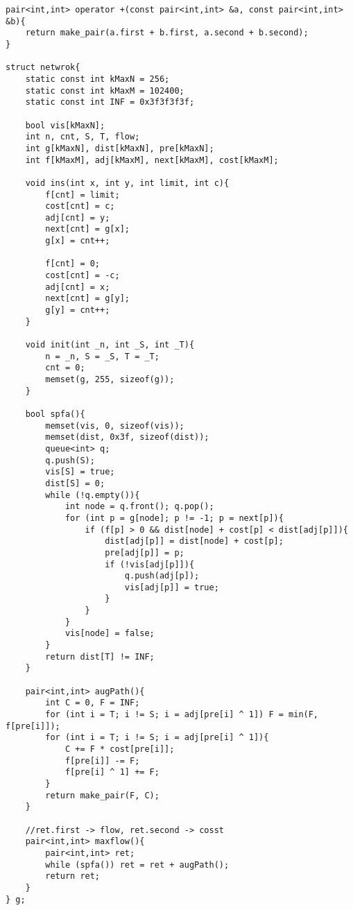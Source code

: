 \begin{verbatim}
pair<int,int> operator +(const pair<int,int> &a, const pair<int,int> &b){
    return make_pair(a.first + b.first, a.second + b.second);
}

struct netwrok{
    static const int kMaxN = 256;
    static const int kMaxM = 102400;
    static const int INF = 0x3f3f3f3f;

    bool vis[kMaxN];
    int n, cnt, S, T, flow;
    int g[kMaxN], dist[kMaxN], pre[kMaxN];
    int f[kMaxM], adj[kMaxM], next[kMaxM], cost[kMaxM];

    void ins(int x, int y, int limit, int c){
        f[cnt] = limit;
        cost[cnt] = c;
        adj[cnt] = y;
        next[cnt] = g[x];
        g[x] = cnt++;

        f[cnt] = 0;
        cost[cnt] = -c;
        adj[cnt] = x;
        next[cnt] = g[y];
        g[y] = cnt++;
    }

    void init(int _n, int _S, int _T){
        n = _n, S = _S, T = _T;
        cnt = 0;
        memset(g, 255, sizeof(g));
    }

    bool spfa(){
        memset(vis, 0, sizeof(vis));
        memset(dist, 0x3f, sizeof(dist));
        queue<int> q;
        q.push(S);
        vis[S] = true;
        dist[S] = 0;
        while (!q.empty()){
            int node = q.front(); q.pop();
            for (int p = g[node]; p != -1; p = next[p]){
                if (f[p] > 0 && dist[node] + cost[p] < dist[adj[p]]){
                    dist[adj[p]] = dist[node] + cost[p];
                    pre[adj[p]] = p;
                    if (!vis[adj[p]]){
                        q.push(adj[p]);
                        vis[adj[p]] = true;
                    }
                }
            }
            vis[node] = false;
        }
        return dist[T] != INF;
    }

    pair<int,int> augPath(){
        int C = 0, F = INF;
        for (int i = T; i != S; i = adj[pre[i] ^ 1]) F = min(F, f[pre[i]]);
        for (int i = T; i != S; i = adj[pre[i] ^ 1]){
            C += F * cost[pre[i]];
            f[pre[i]] -= F;
            f[pre[i] ^ 1] += F;
        }
        return make_pair(F, C);
    }

    //ret.first -> flow, ret.second -> cosst
    pair<int,int> maxflow(){
        pair<int,int> ret;
        while (spfa()) ret = ret + augPath();
        return ret;
    }
} g;
\end{verbatim}
